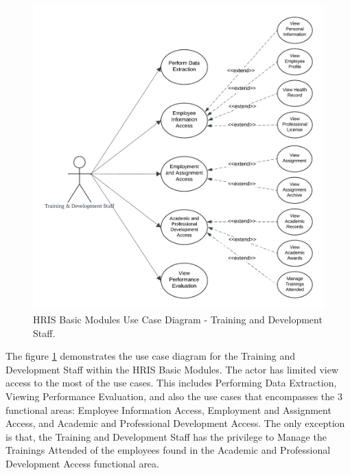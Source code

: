     \begin{figure}[H]
        \centering
        \includegraphics[width=0.9\linewidth]{figures/images/diagrams/usecase/use-case-basic-5.png}
        \caption{HRIS Basic Modules Use Case Diagram - Training and Development Staff.}
        \label{fig:use-case-basic-5}
    \end{figure}
    
    The figure \ref{fig:use-case-basic-5} demonstrates the use case diagram for the Training and Development Staff within the HRIS Basic Modules. The actor has limited view access to the most of the use cases. This includes Performing Data Extraction, Viewing Performance Evaluation, and also the use cases that  encompasses the 3 functional areas: Employee Information Access, Employment and Assignment Access, and Academic and Professional Development Access. The only exception is that, the Training and Development Staff has the privilege to Manage the Trainings Attended of the employees found in the Academic and Professional Development Access functional area.

